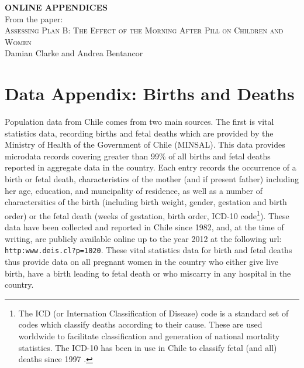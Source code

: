 \documentclass[11pt,subeqn]{article}
\begin{document}
\begin{spacing}{1.4}

\begin{center}
\textbf{ONLINE APPENDICES} \\
\vspace{4mm}
From the paper: \\
\vspace{6mm}
{\large \textsc{Assessing Plan B: 
The Effect of the Morning After Pill on Children and Women}} \\
Damian Clarke and Andrea Bentancor
\end{center}

\tableofcontents


\setlength\parindent{0.25in}
\setlength\parskip{0.25in}


\newpage
\section{Data Appendix: Births and Deaths}
Population data from Chile comes from two main sources.  The first is vital 
statistics data, recording births and fetal deaths which are provided by the 
Ministry of Health of the Government of Chile (MINSAL).  This data provides 
microdata records covering greater than 99\% of all births and fetal deaths 
reported in aggregate data \citep{Bharadwajetal2013} in the country.  Each 
entry records the occurrence of a birth or fetal death, characteristics of the 
mother (and if present father) including her age, education, and muncipality of 
residence, as well as a number of charactersitics of the birth (including birth 
weight, gender, gestation and birth order) or the fetal death (weeks of 
gestation, birth order, ICD-10 code\footnote{The ICD (or Internation 
Classification of Disease) code is a standard set of codes which classify deaths 
according to their cause. These are used worldwide to facilitate classification 
and generation of national mortality statistics. The ICD-10 has been in use in
Chile to classify fetal (and all) deaths since 1997 \citep{INE2014}.}). These 
data have been collected and reported in Chile since 1982, and, at the time of 
writing, are publicly available online up to the year 2012 at the following url: 
\texttt{http:\/\/www.deis.cl\/?p=1020}.  These vital statistics data for birth 
and fetal deaths thus provide data on all pregnant women in the country who 
either give live birth, have a birth leading to fetal death or who miscarry in 
any hospital in the country. 


\end{spacing}
\end{document}
